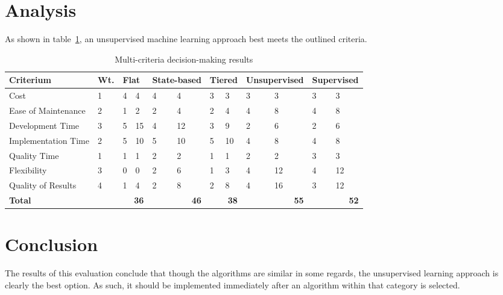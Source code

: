 \documentclass[12pt]{article}
\begin{document}
\section{Analysis}
As shown in table~\ref{tbl:mcdm}, an unsupervised machine learning approach best meets the outlined criteria.

\begin{table}[ht]
\caption{Multi-criteria decision-making results}
\label{tbl:mcdm}
\centering
\begin{tabular}{|p{4.0cm}|p{0.65cm}|p{0.4cm}|p{0.4cm}|p{0.95cm}|p{0.95cm}|p{0.5cm}|p{0.5cm}|p{0.95cm}|p{0.95cm}|p{0.75cm}|p{0.75cm}|}
	\hline
	{\bf Criterium} & {\bf Wt.} & \multicolumn{2}{|p{0.8cm}|}{{\bf Flat}} & \multicolumn{2}{|p{1.9cm}|}{{\bf \mbox{State-based}}} & \multicolumn{2}{|p{1.0cm}|}{{\bf Tiered}} & \multicolumn{2}{|p{1.9cm}|}{{\bf Unsupervised}} & \multicolumn{2}{|p{1.5cm}|}{{\bf Supervised}} \\
	\hline
	\hline
	Cost                & 1 & 4 &  4 & 4 &  4 & 3 &  3 & 3 &  3 & 3 &  3 \\
	Ease of Maintenance & 2 & 1 &  2 & 2 &  4 & 2 &  4 & 4 &  8 & 4 &  8 \\
	Development Time    & 3 & 5 & 15 & 4 & 12 & 3 &  9 & 2 &  6 & 2 &  6 \\
	Implementation Time & 2 & 5 & 10 & 5 & 10 & 5 & 10 & 4 &  8 & 4 &  8 \\
	Quality Time        & 1 & 1 &  1 & 2 &  2 & 1 &  1 & 2 &  2 & 3 &  3 \\
	Flexibility         & 3 & 0 &  0 & 2 &  6 & 1 &  3 & 4 & 12 & 4 & 12 \\
	Quality of Results  & 4 & 1 &  4 & 2 &  8 & 2 &  8 & 4 & 16 & 3 & 12 \\
	\hline
	\hline
	{\bf Total}         &   & \multicolumn{2}{|r|}{{\bf 36}} & \multicolumn{2}{|r|}{{\bf 46}} & \multicolumn{2}{|r|}{{\bf 38}} & \multicolumn{2}{|r|}{{\bf 55}} & \multicolumn{2}{|r|}{{\bf 52}} \\
	\hline
\end{tabular}
\end{table}
\newpage


\section{Conclusion}
The results of this evaluation conclude that though the algorithms are similar in some regards, the unsupervised learning approach is clearly the best option. As such, it should be implemented immediately after an algorithm within that category is selected.
\end{document}

